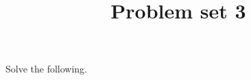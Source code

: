 \documentclass{article}
\title{Problem set 3}
\begin{document}
\maketitle
Solve the following.
\end{document}
